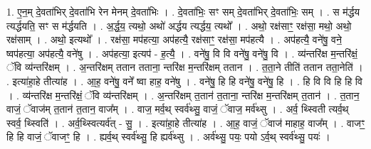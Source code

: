 \documentclass[17pt]{extarticle}
\begin{document}
1. ए॒न॒म् दे॒वता॑भिर् दे॒वता॑भि रेन मेनम् दे॒वता॑भिः । . दे॒वता॑भिः॒ सꣳ सम् दे॒वता॑भिर् दे॒वता॑भिः॒ सम् । . स म॑र्द्धय त्यर्द्धयति॒ सꣳ स म॑र्द्धयति । . अ॒र्द्ध॒य॒ त्यथो॒ अथो॑ अर्द्धय त्यर्द्धय॒ त्यथो᳚ । . अथो॒ रक्ष॑साꣳ॒॒ रक्ष॑सा॒ मथो॒ अथो॒ रक्ष॑साम् । . अथो॒ इत्यथो᳚ । . रक्ष॑सा॒ मप॑हत्या॒ अप॑हत्यै॒ रक्ष॑साꣳ॒॒ रक्ष॑सा॒ मप॑हत्यै । . अप॑हत्यै॒ वने॑षु॒ वने॒ ष्वप॑हत्या॒ अप॑हत्यै॒ वने॑षु । . अप॑हत्या॒ इत्यप॑ - ह॒त्यै॒ । . वने॑षु॒ वि वि वने॑षु॒ वने॑षु॒ वि । . व्य॑न्तरि॑क्ष म॒न्तरि॑क्षं॒ ॅवि व्य॑न्तरि॑क्षम् । . अ॒न्तरि॑क्षम् ततान तताना॒ न्तरि॑क्ष म॒न्तरि॑क्षम् ततान । . त॒ता॒ने तीति॑ ततान तता॒नेति॑ । . इत्या॑हा॒हे तीत्या॑ह । . आ॒ह॒ वने॑षु॒ वने᳚ ष्वा हाह॒ वने॑षु । . वने॑षु॒ हि हि वने॑षु॒ वने॑षु॒ हि । . हि वि वि हि हि वि । . व्य॑न्तरि॑क्ष म॒न्तरि॑क्षं॒ ॅवि व्य॑न्तरि॑क्षम् । . अ॒न्तरि॑क्षम् त॒तान॑ त॒ताना॒ न्तरि॑क्ष म॒न्तरि॑क्षम् त॒तान॑ । . त॒तान॒ वाजं॒ ॅवाज॑म् त॒तान॑ त॒तान॒ वाज᳚म् । . वाज॒ मर्व॒थ् स्वर्व॑थ्सु॒ वाजं॒ ॅवाज॒ मर्व॑थ्सु । . अर्व॒ थ्स्विती त्यर्व॒थ् स्वर्व॒ थ्स्विति॑ । . अर्व॒थ्स्वित्यर्व॑त् - सु॒ । . इत्या॑हा॒हे तीत्या॑ह । . आ॒ह॒ वाजं॒ ॅवाज॑ माहाह॒ वाज᳚म् । . वाजꣳ॒॒ हि हि वाजं॒ ॅवाजꣳ॒॒ हि । . ह्यर्व॒थ् स्वर्व॑थ्सु॒ हि ह्यर्व॑थ्सु । . अर्व॑थ्सु॒ पयः॒ पयो ऽर्व॒थ् स्वर्व॑थ्सु॒ पयः॑ । \newline
\end{document}
